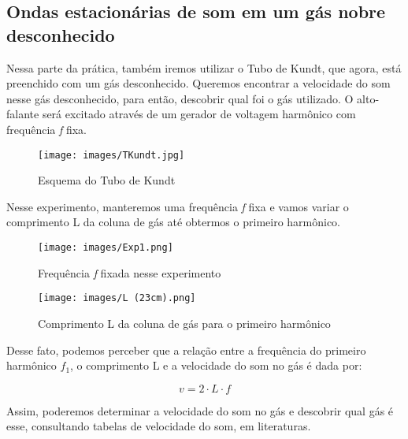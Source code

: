 \subsection{Ondas estacionárias de som em um gás nobre
desconhecido}

Nessa parte da prática, também iremos utilizar o Tubo de Kundt, que agora, está preenchido com um gás desconhecido. Queremos encontrar a velocidade do som nesse gás desconhecido, para então, descobrir qual foi o gás utilizado. O alto-falante será excitado através de um gerador de voltagem harmônico com frequência \textit{f} fixa. 

\begin{figure}[H]
  \centering
  \texttt{[image: images/TKundt.jpg]}
  \caption{Esquema do Tubo de Kundt}
\end{figure}

Nesse experimento, manteremos uma frequência \textit{f} fixa e vamos variar o comprimento L da coluna de gás até obtermos o primeiro harmônico. 

\begin{figure}[H]
  \centering
  \texttt{[image: images/Exp1.png]}
  \caption{Frequência \textit{f} fixada nesse experimento}
\end{figure}

\begin{figure}[H]
  \centering
  \texttt{[image: images/L (23cm).png]}
  \caption{Comprimento L da coluna de gás para o primeiro harmônico}
\end{figure}

Desse fato, podemos perceber que a relação entre a frequência do primeiro harmônico $f_1$, o comprimento L e a velocidade do som no gás é dada por:

\[ v = 2 \cdot L \cdot f\]

Assim, poderemos determinar a velocidade do som no gás e descobrir qual gás é esse, consultando tabelas de velocidade do som, em literaturas.\\

